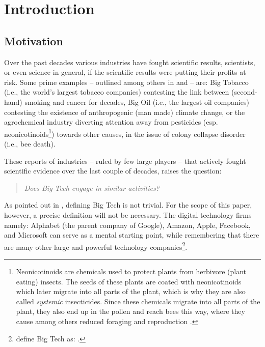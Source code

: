 \section{Introduction}
\label{sec:intro}

\subsection{Motivation}
Over the past decades various industries have fought scientific results, scientists, or even science in general, if the scientific results were putting their profits at risk. 
Some prime examples -- outlined among others in \citet{oreskes_merchants_2010} and \citet{cuveillier_forschung_2020} -- are: 
Big Tobacco (i.e., the world's largest tobacco companies) contesting the link between (second-hand) smoking and cancer for decades, 
Big Oil (i.e., the largest oil companies) contesting the existence of anthropogenic (man made) climate change, 
or the agrochemical industry diverting attention away from pesticides (esp. neonicotinoids\footnote{Neonicotinoids are chemicals used to protect plants from herbivore (plant eating) insects. The seeds of these plants are coated with neonicotinoids which later migrate into all parts of the plant, which is why they are also called \textit{systemic} insecticides. Since these chemicals migrate into all parts of the plant, they also end up in the pollen and reach bees this way, where they cause among others reduced foraging and reproduction \citep{whitehorn_neonicotinoid_2012}.}) towards other causes, in the issue of colony collapse disorder (i.e., bee death).

These reports of industries -- ruled by few large players -- that actively fought scientific evidence over the last couple of decades, raises the question:
\begin{quote}
\itshape
Does Big Tech engage in similar activities?
\end{quote}

As pointed out in \citep{abdalla_grey_2021}, defining Big Tech is not trivial.
For the scope of this paper, however, a precise definition will not be necessary.
The  digital technology firms namely: Alphabet (the parent company of Google), Amazon, Apple, Facebook, and Microsoft can serve as a mental starting point, while remembering that there are many other large and powerful technology companies\footnote{\citet[p 2]{abdalla_grey_2021} define Big Tech as: .\label{foot:big_tech}}.

